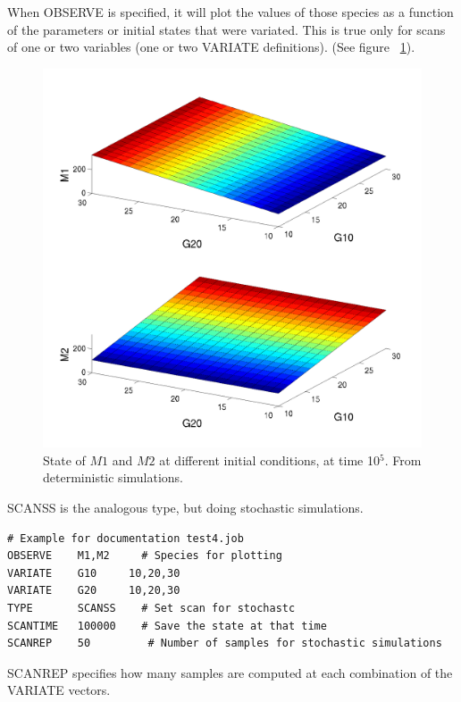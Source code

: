 \documentclass[letterpaper]{article}
\begin{document}
When OBSERVE is specified, it will plot the values of those species as
a function of the parameters or initial states that were
variated. This is true only for scans of one or two variables (one or
two VARIATE definitions). (See figure ~\ref{fig:scandet}).

\begin{figure}[H]
  \centering
  \includegraphics[scale=0.3]{figures/rna2_doc4_scandet_2.png}
  \caption{State of $M1$ and $M2$ at different initial conditions, at
    time 10$^5$. From deterministic simulations.}
  \label{fig:scandet}
\end{figure}

SCANSS is the analogous type, but doing stochastic simulations.
{\footnotesize
\begin{verbatim}
# Example for documentation test4.job
OBSERVE    M1,M2     # Species for plotting
VARIATE    G10     10,20,30
VARIATE    G20     10,20,30
TYPE       SCANSS    # Set scan for stochastc
SCANTIME   100000    # Save the state at that time
SCANREP    50         # Number of samples for stochastic simulations
\end{verbatim}
}
SCANREP specifies how many samples are computed at each combination of
the VARIATE vectors.
\end{document}
